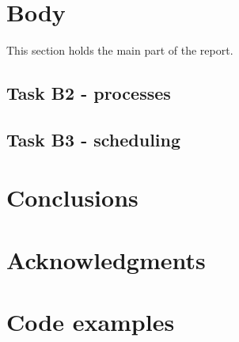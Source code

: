 \documentclass{acm_proc_article-sp}
\begin{document}
\section{Body}
This section holds the main part of the report.



\subsection{Task B2 - processes}


\subsection{Task B3 - scheduling}


\section{Conclusions}


\section{Acknowledgments}






%
%
\appendix



\section{Code examples}
\end{document}

